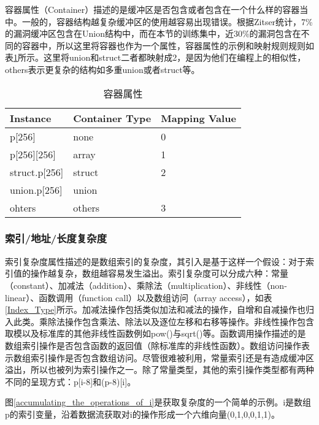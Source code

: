 {容器属性（Container）描述的是缓冲区是否包含或者包含在一个什么样的容器当中。一般的，容器结构越复杂缓冲区的使用越容易出现错误。根据Zitser统计，7\%的漏洞缓冲区包含在Union结构中，而在本节的训练集中，近30\%的漏洞包含在不同的容器中，所以这里将容器也作为一个属性，容器属性的示例和映射规则规则如表\ref{Container_Attributes}所示。这里将union和struct二者都映射成2，是因为他们在编程上的相似性，others表示更复杂的结构如多重union或者struct等。


\begin{table}[ht]
\begin{center}
\caption{容器属性} \label{Container_Attributes}
\begin{small}
\begin{tabular}{lll}
\hline
{\bf Instance } & {\bf Container Type} & {\bf Mapping Value} \\
\hline
p[256] & none &  0\\
\hline
p[256][256] & array & 1 \\ \hline
struct.p[256] & struct & 2  \\ 
union.p[256] & union & \\ \hline
ohters & others & 3 \\ \hline
\end{tabular}
\end{small}
\end{center}
\end{table}

\subsubsection{索引/地址/长度复杂度}

索引复杂度属性描述的是数组索引的复杂度，其引入是基于这样一个假设：对于索引值的操作越复杂，数组越容易发生溢出。索引复杂度可以分成六种：常量（constant）、加减法（addition）、乘除法（multiplication）、非线性（non-linear）、函数调用（function call）以及数组访问（array access），如表\ref{Index_Type}所示。加减法操作包括类似加法和减法的操作，自增和自减操作也归入此类。乘除法操作包含乘法、除法以及逐位左移和右移等操作。非线性操作包含取模以及标准库的其他非线性函数例如pow()与sqrt()等。函数调用操作描述的是数组索引操作是否包含函数的返回值（除标准库的非线性函数）。数组访问操作表示数组索引操作是否包含数组访问。尽管很难被利用，常量索引还是有造成缓冲区溢出，所以也被列为索引操作之一。除了常量类型，其他的索引操作类型都有两种不同的呈现方式：p[i-8]和(p-8)[i]。

图\ref{accumulating_the_operations_of_i}是获取复杂度的一个简单的示例。i是数组p的索引变量，沿着数据流获取对i的操作形成一个六维向量{(0,1,0,0,1,1)}。

}

